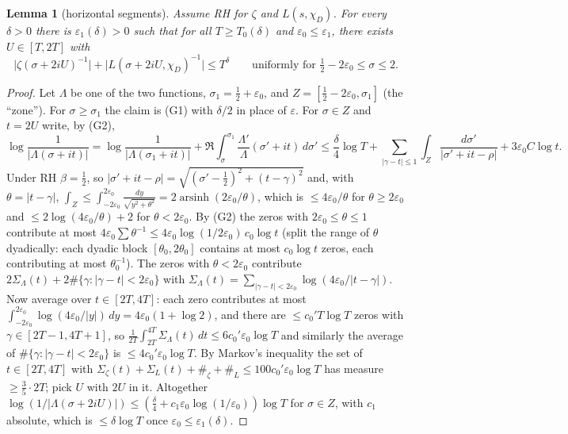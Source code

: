 \documentclass[11pt,a4paper]{article}
\newtheorem{lemma}[theorem]{Lemma}
\theoremstyle{remark}\newtheorem{remark}[theorem]{Remark}
\begin{document}
\begin{lemma}[horizontal segments]\label{lem:horizontal}
Assume RH for $\zeta$ and $L(s,\chi_D)$. For every $\delta>0$ there is $\varepsilon_1(\delta)>0$ such that
for all $T\ge T_0(\delta)$ and $\varepsilon_0\le\varepsilon_1$, there exists $U\in[T,2T]$ with
\[
\bigl|\zeta(\sigma+2iU)^{-1}\bigr|+\bigl|L(\sigma+2iU,\chi_D)^{-1}\bigr|\le T^{\delta}\qquad\text{uniformly for }\tfrac12-2\varepsilon_0\le\sigma\le2 .
\]
\end{lemma}
\begin{proof}
Let $\Lambda$ be one of the two functions, $\sigma_1=\tfrac12+\varepsilon_0$, and $Z=[\tfrac12-2\varepsilon_0,\sigma_1]$
(the ``zone''). For $\sigma\ge\sigma_1$ the claim is (G1) with $\delta/2$ in place of $\varepsilon$. For $\sigma\in Z$ and
$t=2U$ write, by (G2),
\[
\log\frac1{|\Lambda(\sigma+it)|}=\log\frac1{|\Lambda(\sigma_1+it)|}+\Re\int_\sigma^{\sigma_1}\frac{\Lambda'}{\Lambda}(\sigma'+it)\,d\sigma'
\le\frac{\delta}4\log T+\sum_{|\gamma-t|\le1}\int_{Z}\frac{d\sigma'}{|\sigma'+it-\rho|}+3\varepsilon_0C\log t .
\]
Under RH $\beta=\tfrac12$, so $|\sigma'+it-\rho|=\sqrt{(\sigma'-\tfrac12)^2+(t-\gamma)^2}$ and, with
$\theta=|t-\gamma|$, $\int_Z\le\int_{-2\varepsilon_0}^{2\varepsilon_0}\frac{dy}{\sqrt{y^2+\theta^2}}=2\operatorname{arsinh}(2\varepsilon_0/\theta)$,
which is $\le4\varepsilon_0/\theta$ for $\theta\ge2\varepsilon_0$ and $\le2\log(4\varepsilon_0/\theta)+2$ for $\theta<2\varepsilon_0$.
By (G2) the zeros with $2\varepsilon_0\le\theta\le1$ contribute at most $4\varepsilon_0\sum\theta^{-1}\le4\varepsilon_0\log(1/2\varepsilon_0)\,c_0\log t$
(split the range of $\theta$ dyadically: each dyadic block $[\theta_0,2\theta_0]$ contains at most $c_0\log t$ zeros, each contributing at most $\theta_0^{-1}$). The zeros with $\theta<2\varepsilon_0$ contribute $2\Sigma_\Lambda(t)+2\#\{\gamma:|\gamma-t|<2\varepsilon_0\}$
with $\Sigma_\Lambda(t)=\sum_{|\gamma-t|<2\varepsilon_0}\log(4\varepsilon_0/|t-\gamma|)$. Now average over $t\in[2T,4T]$:
each zero contributes at most $\int_{-2\varepsilon_0}^{2\varepsilon_0}\log(4\varepsilon_0/|y|)\,dy=4\varepsilon_0(1+\log2)$, and there are
$\le c_0'T\log T$ zeros with $\gamma\in[2T-1,4T+1]$, so $\frac1{2T}\int_{2T}^{4T}\Sigma_\Lambda(t)\,dt\le 6c_0'\varepsilon_0\log T$
and similarly the average of $\#\{\gamma:|\gamma-t|<2\varepsilon_0\}$ is $\le4c_0'\varepsilon_0\log T$. By Markov's inequality the set
of $t\in[2T,4T]$ with $\Sigma_\zeta(t)+\Sigma_L(t)+\#_\zeta+\#_L\le 100c_0'\varepsilon_0\log T$ has measure $\ge\tfrac{3}{5}\cdot2T$;
pick $U$ with $2U$ in it. Altogether $\log(1/|\Lambda(\sigma+2iU)|)\le(\tfrac\delta4+c_1\varepsilon_0\log(1/\varepsilon_0))\log T$
for $\sigma\in Z$, with $c_1$ absolute, which is $\le\delta\log T$ once $\varepsilon_0\le\varepsilon_1(\delta)$.
\end{proof}
\end{document}

